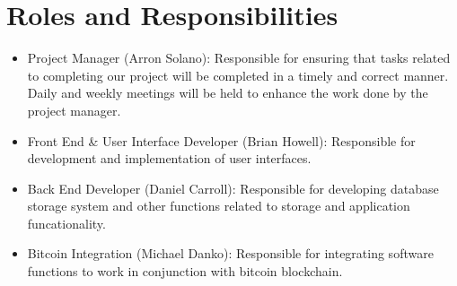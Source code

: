 \documentclass[12pt]{article}
\begin{document}
  

  \tableofcontents

  \clearpage

  \setcounter{page}{1}

  \section{Roles and Responsibilities}
  \begin{adjustwidth}{1.5em}{0pt}
    \begin{itemize}
      \item Project Manager (Arron Solano): Responsible for ensuring that tasks related to completing our project will be completed in a timely and correct manner. Daily and weekly meetings will be held to enhance the work done by the project manager.
      \item Front End \& User Interface Developer (Brian Howell): Responsible for development and implementation of user interfaces.
      \item Back End Developer (Daniel Carroll): Responsible for developing database storage system and other functions related to storage and application funcationality.
       \item Bitcoin Integration (Michael Danko): Responsible for integrating software functions to work in conjunction with bitcoin blockchain.
    \end{itemize}
    
\end{adjustwidth}
\end{document}
